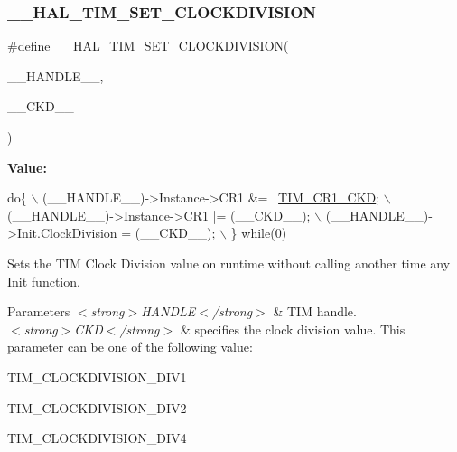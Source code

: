\subsubsection{\texorpdfstring{\+\_\+\+\_\+\+H\+A\+L\+\_\+\+T\+I\+M\+\_\+\+S\+E\+T\+\_\+\+C\+L\+O\+C\+K\+D\+I\+V\+I\+S\+I\+ON}{\_\_HAL\_TIM\_SET\_CLOCKDIVISION}}
{\footnotesize\ttfamily \#define \+\_\+\+\_\+\+H\+A\+L\+\_\+\+T\+I\+M\+\_\+\+S\+E\+T\+\_\+\+C\+L\+O\+C\+K\+D\+I\+V\+I\+S\+I\+ON(\begin{DoxyParamCaption}\item[{}]{\+\_\+\+\_\+\+H\+A\+N\+D\+L\+E\+\_\+\+\_\+,  }\item[{}]{\+\_\+\+\_\+\+C\+K\+D\+\_\+\+\_\+ }\end{DoxyParamCaption})}

{\bfseries Value\+:}
\begin{DoxyCode}
\textcolor{keywordflow}{do}\{                                                    \(\backslash\)
                              (\_\_HANDLE\_\_)->Instance->CR1 &= ~\hyperlink{group___peripheral___registers___bits___definition_gacacc4ff7e5b75fd2e4e6b672ccd33a72}{TIM\_CR1\_CKD};  \(\backslash\)
                              (\_\_HANDLE\_\_)->Instance->CR1 |= (\_\_CKD\_\_);                   \(\backslash\)
                              (\_\_HANDLE\_\_)->Init.ClockDivision = (\_\_CKD\_\_);             \(\backslash\)
                          \} \textcolor{keywordflow}{while}(0)
\end{DoxyCode}


Sets the T\+IM Clock Division value on runtime without calling another time any Init function. 


\begin{DoxyParams}{Parameters}
{\em $<$strong$>$\+H\+A\+N\+D\+L\+E$<$/strong$>$} & T\+IM handle. \\
\hline
{\em $<$strong$>$\+C\+K\+D$<$/strong$>$} & specifies the clock division value. This parameter can be one of the following value\+: \begin{DoxyItemize}
\item T\+I\+M\+\_\+\+C\+L\+O\+C\+K\+D\+I\+V\+I\+S\+I\+O\+N\+\_\+\+D\+I\+V1 \item T\+I\+M\+\_\+\+C\+L\+O\+C\+K\+D\+I\+V\+I\+S\+I\+O\+N\+\_\+\+D\+I\+V2 \item T\+I\+M\+\_\+\+C\+L\+O\+C\+K\+D\+I\+V\+I\+S\+I\+O\+N\+\_\+\+D\+I\+V4 \end{DoxyItemize}
\\
\hline
\end{DoxyParams}

